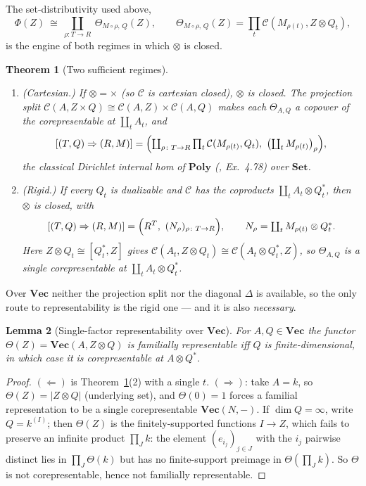 \documentclass[11pt]{amsart}
\theoremstyle{plain}
\newtheorem{theorem}{Theorem}[section]
\newtheorem{lemma}[theorem]{Lemma}
\theoremstyle{definition}
\theoremstyle{remark}
\newcommand{\C}{\mathcal{C}}
\newcommand{\Set}{\mathbf{Set}}
\newcommand{\Vect}{\mathbf{Vec}}
\newcommand{\Poly}{\mathbf{Poly}}
\newcommand{\ihom}[2]{[#1,#2]}
\newcommand{\coprodd}{\textstyle\coprod}
\newcommand{\prodd}{\textstyle\prod}
\begin{document}
The set-distributivity used above,
\begin{equation}\label{eq:star}
\Phi(Z)\ \cong\ \coprodd_{\rho\colon T\to R}\ \Theta_{M\circ\rho,\,Q}(Z),\qquad
\Theta_{M\circ\rho,\,Q}(Z)=\prodd_t\C(M_{\rho(t)},Z\otimes Q_t),
\end{equation}
is the engine of both regimes in which $\otimes$ is closed.

\begin{theorem}[Two sufficient regimes]\label{thm:regimes}
\begin{enumerate}
\item \emph{(Cartesian.)} If $\otimes=\times$ (so $\C$ is cartesian closed), $\otimes$ is closed. The
projection split $\C(A,Z\times Q)\cong\C(A,Z)\times\C(A,Q)$ makes each $\Theta_{A,Q}$ a copower of the
corepresentable at $\coprodd_t A_t$, and
\[
[(T,Q)\Rightarrow(R,M)]=\Bigl(\coprodd_{\rho\colon T\to R}\prodd_t\C(M_{\rho(t)},Q_t),\ \bigl(\coprodd_t M_{\rho(t)}\bigr)_\rho\Bigr),
\]
the classical Dirichlet internal hom of $\Poly$ (\cite{NiuSpivak}, Ex.~4.78) over $\Set$.
\item \emph{(Rigid.)} If every $Q_t$ is dualizable and $\C$ has the coproducts $\coprodd_t A_t\otimes
Q_t^*$, then $\otimes$ is closed, with
\[
[(T,Q)\Rightarrow(R,M)]=\Bigl(R^T,\ (N_\rho)_{\rho\colon T\to R}\Bigr),\qquad N_\rho=\coprodd_t M_{\rho(t)}\otimes Q_t^*.
\]
Here $Z\otimes Q_t\cong\ihom{Q_t^*}{Z}$ gives $\C(A_t,Z\otimes Q_t)\cong\C(A_t\otimes Q_t^*,Z)$, so
$\Theta_{A,Q}$ is a single corepresentable at $\coprodd_t A_t\otimes Q_t^*$.
\end{enumerate}
\end{theorem}

Over $\Vect$ neither the projection split nor the diagonal $\Delta$ is available, so the only route
to representability is the rigid one --- and it is also \emph{necessary}.

\begin{lemma}[Single-factor representability over $\Vect$]\label{lem:vecrep}
For $A,Q\in\Vect$ the functor $\Theta(Z)=\Vect(A,Z\otimes Q)$ is familially representable iff $Q$ is
finite-dimensional, in which case it is corepresentable at $A\otimes Q^*$.
\end{lemma}
\begin{proof}
$(\Leftarrow)$ is Theorem~\ref{thm:regimes}(2) with a single $t$. $(\Rightarrow)$: take $A=k$, so
$\Theta(Z)=|Z\otimes Q|$ (underlying set), and $\Theta(0)=1$ forces a familial representation to be a
single corepresentable $\Vect(N,-)$. If $\dim Q=\infty$, write $Q=k^{(I)}$; then $\Theta(Z)$ is the
finitely-supported functions $I\to Z$, which fails to preserve an infinite product $\prodd_J k$: the
element $(e_{i_j})_{j\in J}$ with the $i_j$ pairwise distinct lies in $\prodd_J\Theta(k)$ but has no
finite-support preimage in $\Theta(\prodd_J k)$. So $\Theta$ is not corepresentable, hence not
familially representable.
\end{proof}
\end{document}

